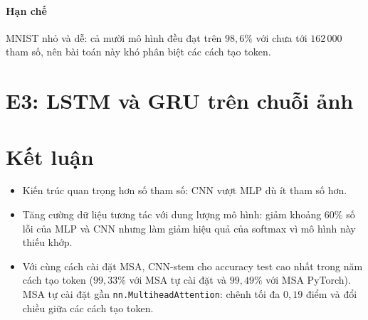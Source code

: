\documentclass[a4paper,12pt]{article}
\begin{document}
\paragraph{Hạn chế} MNIST nhỏ và dễ: cả mười mô hình đều đạt trên $98{,}6\%$ với chưa tới $162\,000$ tham số, nên bài toán này khó phân biệt các cách tạo token.
\section{E3: LSTM và GRU trên chuỗi ảnh}
\label{sec:e3}

\section{Kết luận}
\label{sec:conclusion}
\begin{itemize}
    \item Kiến trúc quan trọng hơn số tham số: CNN vượt MLP dù ít tham số hơn.
    \item Tăng cường dữ liệu tương tác với dung lượng mô hình: giảm khoảng $60\%$ số lỗi của MLP và CNN nhưng làm giảm hiệu quả của softmax vì mô hình này thiếu khớp.
    \item Với cùng cách cài đặt MSA, CNN-stem cho accuracy test cao nhất trong năm cách tạo token ($99{,}33\%$ với MSA tự cài đặt và $99{,}49\%$ với MSA PyTorch). MSA tự cài đặt gần \texttt{nn.MultiheadAttention}: chênh tối đa $0{,}19$ điểm và đổi chiều giữa các cách tạo token.
\end{itemize}



\end{document}
